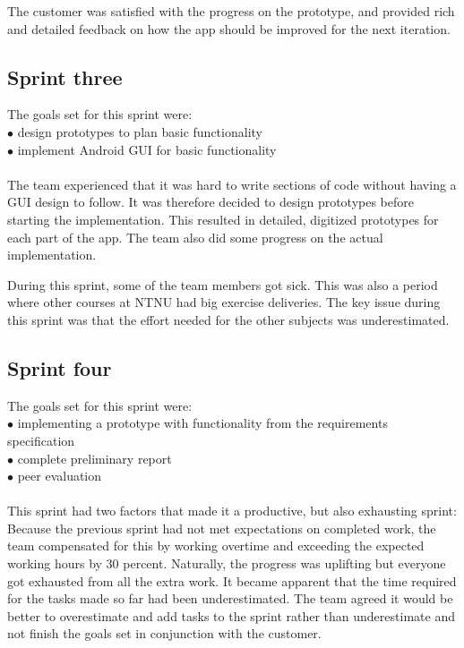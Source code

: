 The customer was satisfied with the progress on the prototype, and provided rich and detailed feedback on how the app should be improved for the next iteration.

\subsection{Sprint three}
The goals set for this sprint were:\\
$\bullet$\hspace{0.25cm} design prototypes to plan basic functionality\\
$\bullet$\hspace{0.25cm} implement Android GUI for basic functionality\\\\
The team experienced that it was hard to write sections of code without having a GUI design to follow. It was therefore decided to design prototypes before starting the implementation. This resulted in detailed, digitized prototypes for each part of the app. The team also did some progress on the actual implementation.

During this sprint, some of the team members got sick. This was also a period where other courses at NTNU had big exercise deliveries. The key issue during this sprint was that the effort needed for the other subjects was underestimated. 

\subsection{Sprint four}
The goals set for this sprint were:\\
$\bullet$\hspace{0.25cm} implementing a prototype with functionality from the requirements specification\\
$\bullet$\hspace{0.25cm} complete preliminary report\\
$\bullet$\hspace{0.25cm} peer evaluation\\\\
This sprint had two factors that made it a productive, but also exhausting sprint: Because the previous sprint had not met expectations on completed work, the team compensated for this by working overtime and exceeding the expected working hours by 30 percent. Naturally, the progress was uplifting but everyone got exhausted from all the extra work. It became apparent that the time required for the tasks made so far had been underestimated. The team agreed it would be better to overestimate and add tasks to the sprint rather than underestimate and not finish the goals set in conjunction with the customer.


